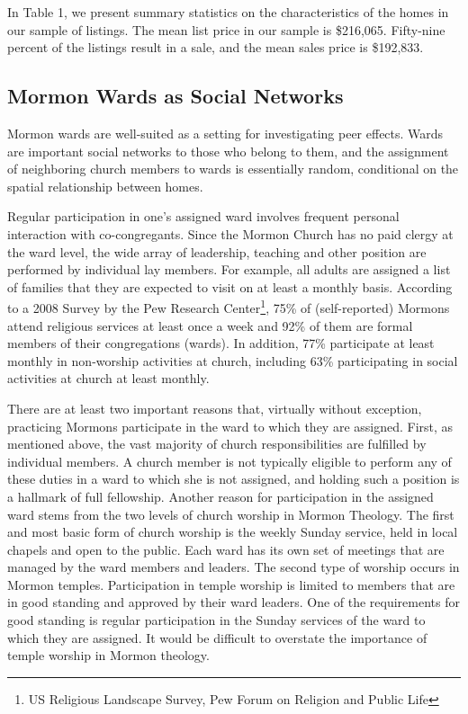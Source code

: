 \documentclass[12pt]{article}
\begin{document}
    In Table 1, we present summary statistics on the characteristics of the homes in our sample of listings. The mean list price in our sample is
    \$216,065.  Fifty-nine percent of the listings result in a sale, and the mean sales price is \$192,833.

\subsection*{Mormon Wards as Social Networks}

    Mormon wards are well-suited as a setting for investigating peer effects. Wards are important social networks to those who belong to
    them, and the assignment of neighboring church members to wards is essentially random, conditional on the spatial relationship between homes.

    Regular participation in one's assigned ward involves frequent personal interaction with
    co-congregants. Since the Mormon Church has no paid clergy at the ward level, the wide array of leadership, teaching and other position are performed by individual lay
    members. For example, all adults are assigned a list of families that they are expected to visit on at least a monthly basis. According to a 2008
    Survey by the Pew Research Center\footnote{US Religious Landscape Survey, Pew Forum on Religion  and Public Life}, 75\% of (self-reported) Mormons
    attend religious services at least once a week and 92\% of them are formal members of their congregations (wards). In addition, 77\% participate
    at least monthly
    in non-worship activities at church, including  63\% participating in social activities at church at least monthly.

    There are at least two important reasons that, virtually without exception, practicing Mormons participate in the ward to which
    they are assigned. First, as mentioned above, the vast majority of church responsibilities are fulfilled by individual members. A church member is
    not typically eligible to perform any of these duties in a ward to which she is not assigned, and holding such a position is a
    hallmark of full fellowship.  Another reason for participation in the assigned ward stems from the two levels of church worship in Mormon Theology. The first and most basic form of
    church worship is the weekly Sunday service, held in local chapels and open to the public. Each
    ward has its own set of meetings that are managed by the ward members and leaders. The second type of worship occurs in Mormon temples.
    Participation in temple worship is limited to members that are in good standing and approved by their ward leaders. One of the requirements for good
    standing is regular participation in the Sunday services of the ward to which they are assigned. It would be difficult to overstate the importance of temple worship in Mormon theology.
\end{document}
